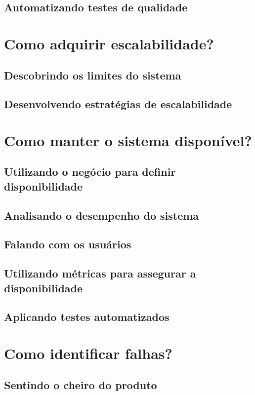     \subsection{Automatizando testes de qualidade}

  \section{Como adquirir escalabilidade?}
    \subsection{Descobrindo os limites do sistema}
    \subsection{Desenvolvendo estratégias de escalabilidade}

  \section{Como manter o sistema disponível?}
    \subsection{Utilizando o negócio para definir disponibilidade}
    \subsection{Analisando o desempenho do sistema}
    \subsection{Falando com os usuários}
    \subsection{Utilizando métricas para assegurar a disponibilidade}
    \subsection{Aplicando testes automatizados}

  \section{Como identificar falhas?}
    \subsection{Sentindo o cheiro do produto}
